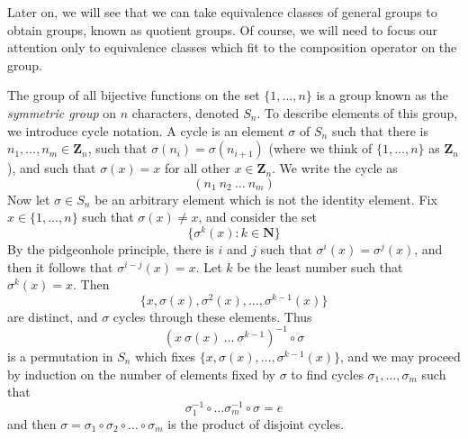 Later on, we will see that we can take equivalence classes of general groups to obtain groups, known as quotient groups. Of course, we will need to focus our attention only to equivalence classes which fit to the composition operator on the group.

\begin{example}
    The group of all bijective functions on the set $\{ 1, \dots, n \}$ is a group known as the \emph{symmetric group} on $n$ characters, denoted $S_n$. To describe elements of this group, we introduce cycle notation. A cycle is an element $\sigma$ of $S_n$ such that there is $n_1, \dots, n_m \in \mathbf{Z}_n$, such that $\sigma(n_i) = \sigma(n_{i+1})$ (where we think of $\{ 1, \dots, n \}$ as $\mathbf{Z}_n$), and such that $\sigma(x) = x$ for all other $x \in \mathbf{Z}_n$. We write the cycle as
    \[ (n_1\ n_2\ \dots\ n_m) \]
    Now let $\sigma \in S_n$ be an arbitrary element which is not the identity element. Fix $x \in \{ 1, \dots, n \}$ such that $\sigma(x) \neq x$, and consider the set
    \[ \{ \sigma^k(x) : k \in \mathbf{N} \} \]
    By the pidgeonhole principle, there is $i$ and $j$ such that $\sigma^i(x) = \sigma^j(x)$, and then it follows that $\sigma^{i-j}(x) = x$. Let $k$ be the least number such that $\sigma^k(x) = x$. Then
    \[ \{ x, \sigma(x), \sigma^2(x), \dots, \sigma^{k-1}(x) \} \]
    are distinct, and $\sigma$ cycles through these elements. Thus
    \[ (x\ \sigma(x)\ \dots\ \sigma^{k-1})^{-1} \circ \sigma \]
    is a permutation in $S_n$ which fixes $\{ x, \sigma(x), \dots, \sigma^{k-1}(x) \}$, and we may proceed by induction on the number of elements fixed by $\sigma$ to find cycles $\sigma_1, \dots, \sigma_m$ such that
    \[ \sigma_1^{-1} \circ \dots \sigma_m^{-1} \circ \sigma = e \]
    and then $\sigma = \sigma_1 \circ \sigma_2 \circ \dots \circ \sigma_m$ is the product of disjoint cycles.
\end{example}


